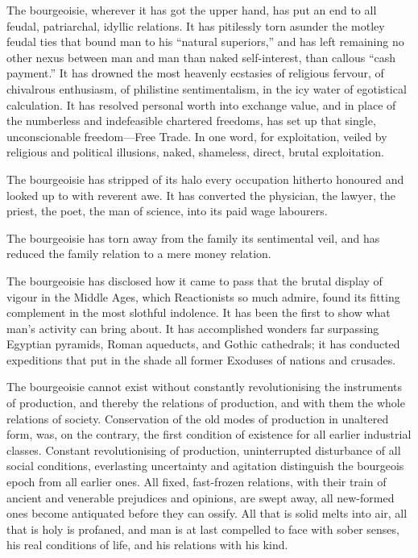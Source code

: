 The bourgeoisie, wherever it has got the upper hand, has put an end to
all feudal, patriarchal, idyllic relations. It has pitilessly torn
asunder the motley feudal ties that bound man to his “natural
superiors,” and has left remaining no other nexus between man and man
than naked self-interest, than callous “cash payment.” It has drowned
the most heavenly ecstasies of religious fervour, of chivalrous
enthusiasm, of philistine sentimentalism, in the icy water of
egotistical calculation. It has resolved personal worth into exchange
value, and in place of the numberless and indefeasible chartered
freedoms, has set up that single, unconscionable freedom—Free Trade. In
one word, for exploitation, veiled by religious and political
illusions, naked, shameless, direct, brutal exploitation.

The bourgeoisie has stripped of its halo every occupation hitherto
honoured and looked up to with reverent awe. It has converted the
physician, the lawyer, the priest, the poet, the man of science, into
its paid wage labourers.

The bourgeoisie has torn away from the family its sentimental veil, and
has reduced the family relation to a mere money relation.

The bourgeoisie has disclosed how it came to pass that the brutal
display of vigour in the Middle Ages, which Reactionists so much
admire, found its fitting complement in the most slothful indolence. It
has been the first to show what man’s activity can bring about. It has
accomplished wonders far surpassing Egyptian pyramids, Roman aqueducts,
and Gothic cathedrals; it has conducted expeditions that put in the
shade all former Exoduses of nations and crusades.

The bourgeoisie cannot exist without constantly revolutionising the
instruments of production, and thereby the relations of production, and
with them the whole relations of society. Conservation of the old modes
of production in unaltered form, was, on the contrary, the first
condition of existence for all earlier industrial classes. Constant
revolutionising of production, uninterrupted disturbance of all social
conditions, everlasting uncertainty and agitation distinguish the
bourgeois epoch from all earlier ones. All fixed, fast-frozen
relations, with their train of ancient and venerable prejudices and
opinions, are swept away, all new-formed ones become antiquated before
they can ossify. All that is solid melts into air, all that is holy is
profaned, and man is at last compelled to face with sober senses, his
real conditions of life, and his relations with his kind.

